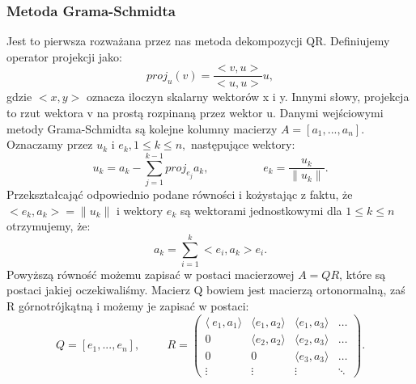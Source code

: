 \subsubsection{Metoda Grama-Schmidta}
Jest to pierwsza rozważana przez nas metoda dekompozycji QR. Definiujemy
operator projekcji jako:
$$proj_u(v)=\frac{<v,u>}{<u,u>}u,$$
gdzie $<x,y>$ oznacza iloczyn skalarny wektorów x i y. Innymi słowy, projekcja
to rzut wektora v na prostą rozpinaną przez wektor u. Danymi wejściowymi
metody Grama-Schmidta są kolejne kolumny macierzy $A=[a_1,...,a_n]$.
Oznaczamy przez ${u_k}$ i ${e_k}, 1 \leq k \leq n,$ następujące wektory:
$$ u_k = a_k-\sum_{j=1}^{k-1} proj_{e_j}a_k, \hspace{2cm}
e_k = \frac{u_k}{\|u_k\|}.$$
Przekształcająć odpowiednio podane równości i kożystając z faktu, że
$<e_k, a_k> = \|u_k\|$ i wektory $e_k$ są wektorami jednostkowymi dla
$1 \leq k \leq n$ otrzymujemy, że:
$$ a_k = \sum_{i=1}^{k} <e_i,a_k>e_i.$$
Powyższą równość możemu zapisać w postaci macierzowej $A=QR$, które są
postaci jakiej oczekiwaliśmy. Macierz Q bowiem jest macierzą ortonormalną,
zaś R górnotrójkątną i możemy je zapisać w postaci:
$$ Q = [e_1,...,e_n], \hspace{1cm} R = \begin{pmatrix} \langle\ e_1,a_1
\rangle & \langle e_1,a_2\rangle & \langle e_1, a_3\rangle & \ldots \\ 0
& \langle e_2, a_2\rangle & \langle e_2, a_3\rangle & \ldots \\ 0 & 0 &
\langle e_3, a_3\rangle & \ldots \\ \vdots & \vdots & \vdots & \ddots
\end{pmatrix}.$$
